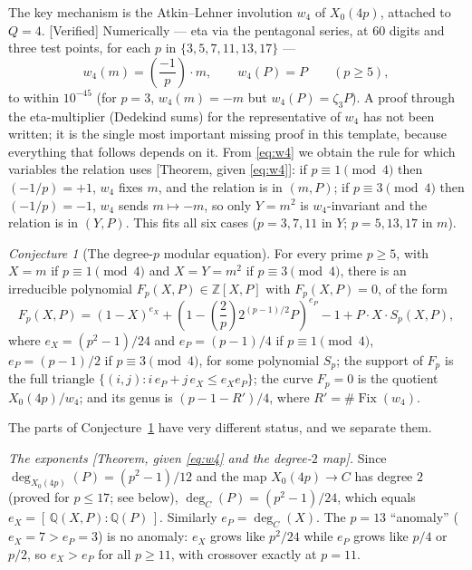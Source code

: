 \documentclass[11pt]{amsart}
\theoremstyle{plain}
\theoremstyle{definition}
\theoremstyle{remark}
\newtheorem*{conjecture}{Conjecture}
\newcommand{\Z}{\mathbb{Z}}
\newcommand{\Q}{\mathbb{Q}}
\begin{document}
The key mechanism is the Atkin--Lehner involution $w_4$ of $X_0(4p)$, attached
to $Q = 4$. [Verified] Numerically --- eta via the pentagonal series, at 60
digits and three test points, for each $p$ in $\{3, 5, 7, 11, 13, 17\}$ ---
\begin{equation}
w_4(m) = \left(\frac{-1}{p}\right)\cdot m, \qquad w_4(P) = P
\qquad (p \geq 5),
\label{eq:w4}
\end{equation}
to within $10^{-45}$ (for $p = 3$, $w_4(m) = -m$ but $w_4(P) = \zeta_3 P$).
A proof through the eta-multiplier (Dedekind sums) for the representative of
$w_4$ has not been written; it is the single most important missing proof in
this template, because everything that follows depends on it. From
\eqref{eq:w4} we obtain the rule for which variables the relation uses
[Theorem, given \eqref{eq:w4}]: if $p \equiv 1 \pmod 4$ then $(-1/p) = +1$,
$w_4$ fixes $m$, and the relation is in $(m,P)$; if $p \equiv 3 \pmod 4$ then
$(-1/p) = -1$, $w_4$ sends $m \mapsto -m$, so only $Y = m^2$ is
$w_4$-invariant and the relation is in $(Y,P)$. This fits all six cases
($p = 3, 7, 11$ in $Y$; $p = 5, 13, 17$ in $m$).

\begin{conjecture}[The degree-$p$ modular equation]
\label{conj:template}
For every prime $p \geq 5$, with $X = m$ if $p \equiv 1 \pmod 4$ and
$X = Y = m^2$ if $p \equiv 3 \pmod 4$, there is an irreducible polynomial
$F_p(X,P) \in \Z[X,P]$ with $F_p(X,P) = 0$, of the form
\begin{equation}
F_p(X,P) = (1-X)^{e_X} + \left(1 - \left(\frac{2}{p}\right)2^{(p-1)/2}P\right)^{e_P}
- 1 + P\cdot X\cdot S_p(X,P),
\label{eq:template}
\end{equation}
where $e_X = (p^2-1)/24$ and $e_P = (p-1)/4$ if $p \equiv 1 \pmod 4$,
$e_P = (p-1)/2$ if $p \equiv 3 \pmod 4$, for some polynomial $S_p$; the
support of $F_p$ is the full triangle
$\{(i,j) : i\,e_P + j\,e_X \leq e_X e_P\}$; the curve $F_p = 0$ is the quotient
$X_0(4p)/w_4$; and its genus is $(p-1-R')/4$, where $R' = \#\operatorname{Fix}(w_4)$.
\end{conjecture}

The parts of Conjecture~\ref{conj:template} have very different status, and we
separate them.

\emph{The exponents [Theorem, given \eqref{eq:w4} and the degree-$2$ map].}
Since $\deg_{X_0(4p)}(P) = (p^2-1)/12$ and the map $X_0(4p) \to C$ has degree
$2$ (proved for $p \leq 17$; see below), $\deg_C(P) = (p^2-1)/24$, which equals
$e_X = [\,\Q(X,P):\Q(P)\,]$. Similarly $e_P = \deg_C(X)$. The $p = 13$
``anomaly'' ($e_X = 7 > e_P = 3$) is no anomaly: $e_X$ grows like $p^2/24$
while $e_P$ grows like $p/4$ or $p/2$, so $e_X > e_P$ for all $p \geq 11$,
with crossover exactly at $p = 11$.
\end{document}
